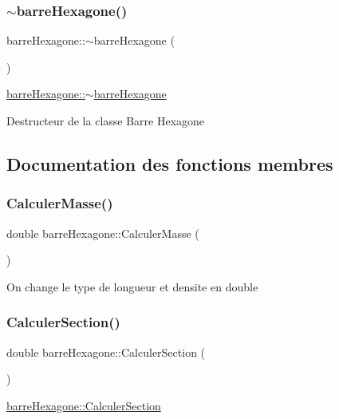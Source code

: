 \subsubsection{\texorpdfstring{$\sim$barre\+Hexagone()}{~barreHexagone()}}
{\footnotesize\ttfamily barre\+Hexagone\+::$\sim$barre\+Hexagone (\begin{DoxyParamCaption}{ }\end{DoxyParamCaption})}



\hyperlink{classbarre_hexagone_a525e2b1acce9f429ab4aad471b7e86da}{barre\+Hexagone\+::$\sim$barre\+Hexagone} 

Destructeur de la classe Barre Hexagone 

\subsection{Documentation des fonctions membres}
\mbox{\label{classbarre_hexagone_a310610a3d03be6010899d1741a853b5b}} 
\subsubsection{\texorpdfstring{Calculer\+Masse()}{CalculerMasse()}}
{\footnotesize\ttfamily double barre\+Hexagone\+::\+Calculer\+Masse (\begin{DoxyParamCaption}{ }\end{DoxyParamCaption})}

On change le type de longueur et densite en double \mbox{\label{classbarre_hexagone_a456a7b2330ae62eac9be943d6cfadeca}} 
\subsubsection{\texorpdfstring{Calculer\+Section()}{CalculerSection()}}
{\footnotesize\ttfamily double barre\+Hexagone\+::\+Calculer\+Section (\begin{DoxyParamCaption}{ }\end{DoxyParamCaption})}



\hyperlink{classbarre_hexagone_a456a7b2330ae62eac9be943d6cfadeca}{barre\+Hexagone\+::\+Calculer\+Section} 

